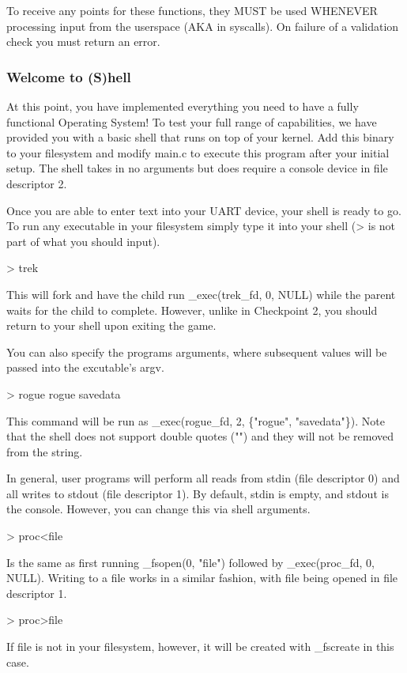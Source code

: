\documentclass{article}
\begin{document}
	To receive any points for these functions, they MUST be used WHENEVER processing input from the userspace (AKA in syscalls). On failure of a validation check you must return an error.
	\subsubsection{Welcome to (S)hell}

	At this point, you have implemented everything you need to have a fully functional Operating System! To test your full range of capabilities, we have provided you with a
	basic shell that runs on top of your kernel. Add this binary to your filesystem and modify {\fix main.c} to execute this program after your initial setup. The shell takes
	in no arguments but does require a console device in file descriptor 2.

	Once you are able to enter text into your UART device, your shell is ready to go. To run any executable in your filesystem simply type it into your shell ({\fix > is not part of what you should input}).
	
	{\fix > trek} 
	
	This will {\fix fork} and have the child run {\fix \_exec(trek\_fd, 0, NULL)} while the parent waits for the child to complete. However, unlike in Checkpoint 2, you should return to your shell upon exiting the game.

	You can also specify the programs arguments, where subsequent values will be passed into the excutable's {\fix argv}. 
	
	{\fix > rogue rogue savedata}

	This command will be run as {\fix \_exec(rogue\_fd, 2, \{"rogue", "savedata"\})}. Note that the shell does not support double quotes ({\fix ""}) and they will not be removed from the 
	string.

	In general, user programs will perform all reads from {\fix stdin} (file descriptor 0) and all writes to {\fix stdout} (file descriptor 1). By default, 
	{\fix stdin} is empty, and {\fix stdout} is the console. However, you can change this via shell arguments.
	
	{\fix > proc<file}

	Is the same as first running {\fix \_fsopen(0, "file")} followed by {\fix \_exec(proc\_fd, 0, NULL)}. Writing to a file works in a similar fashion, with {\fix file} being
	opened in file descriptor 1.

	{\fix > proc>file}

	If {\fix file} is not in your filesystem, however, it will be created with {\fix\_fscreate} in this case.
\end{document}

